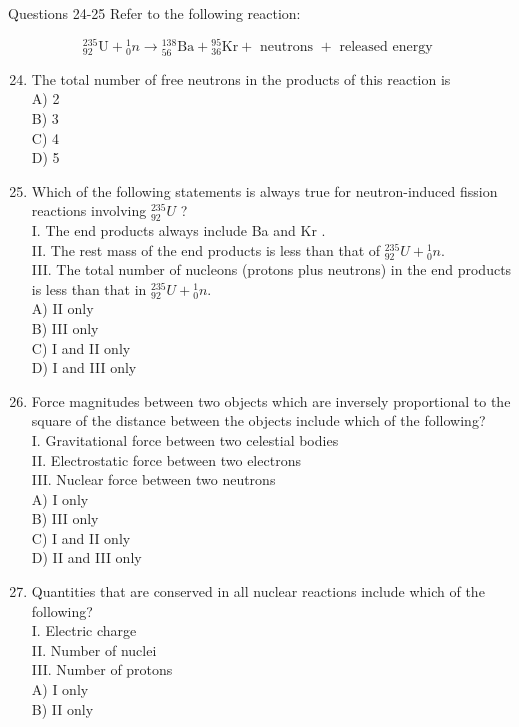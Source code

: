 \begin{enumerate}
Questions 24-25 Refer to the following reaction:

$$
{ }_{92}^{235} \mathrm{U}+{ }_{0}^{1} n \rightarrow{ }_{56}^{138} \mathrm{Ba}+{ }_{36}^{95} \mathrm{Kr}+\text { neutrons }+ \text { released energy }
$$

\begin{enumerate}
  \setcounter{enumi}{23}
  \item The total number of free neutrons in the products of this reaction is\\
A) 2\\
B) 3\\
C) 4\\
D) 5
  \item Which of the following statements is always true for neutron-induced fission reactions involving ${ }_{92}^{235} U$ ?\\
I. The end products always include Ba and Kr .\\
II. The rest mass of the end products is less than that of ${ }_{92}^{235} U+{ }_{0}^{1} n$.\\
III. The total number of nucleons (protons plus neutrons) in the end products is less than that in ${ }_{92}^{235} U+{ }_{0}^{1} n$.\\
A) II only\\
B) III only\\
C) I and II only\\
D) I and III only
  \item Force magnitudes between two objects which are inversely proportional to the square of the distance between the objects include which of the following?\\
I. Gravitational force between two celestial bodies\\
II. Electrostatic force between two electrons\\
III. Nuclear force between two neutrons\\
A) I only\\
B) III only\\
C) I and II only\\
D) II and III only
  \item Quantities that are conserved in all nuclear reactions include which of the following?\\
I. Electric charge\\
II. Number of nuclei\\
III. Number of protons\\
A) I only\\
B) II only\\

\end{enumerate}
\end{enumerate}
